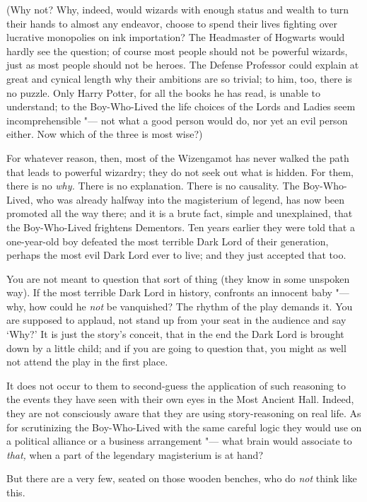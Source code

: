 (Why not? Why, indeed, would wizards with enough status and wealth to
turn their hands to almost any endeavor, choose to spend their lives
fighting over lucrative monopolies on ink importation? The Headmaster of
Hogwarts would hardly see the question; of course most people should not
be powerful wizards, just as most people should not be heroes. The
Defense Professor could explain at great and cynical length why their
ambitions are so trivial; to him, too, there is no puzzle. Only Harry
Potter, for all the books he has read, is unable to understand; to the
Boy-Who-Lived the life choices of the Lords and Ladies seem
incomprehensible "--- not what a good person would do, nor yet an evil
person either. Now which of the three is most wise?)

For whatever reason, then, most of the Wizengamot has never walked the
path that leads to powerful wizardry; they do not seek out what is
hidden. For them, there is no \emph{why.} There is no explanation. There
is no causality. The Boy-Who-Lived, who was already halfway into the
magisterium of legend, has now been promoted all the way there; and it
is a brute fact, simple and unexplained, that the Boy-Who-Lived
frightens Dementors. Ten years earlier they were told that a
one-year-old boy defeated the most terrible Dark Lord of their
generation, perhaps the most evil Dark Lord ever to live; and they just
accepted that too.

You are not meant to question that sort of thing (they know in some
unspoken way). If the most terrible Dark Lord in history, confronts an
innocent baby "--- why, how could he \emph{not} be vanquished? The rhythm
of the play demands it. You are supposed to applaud, not stand up from
your seat in the audience and say `Why?' It is just the story's conceit,
that in the end the Dark Lord is brought down by a little child; and if
you are going to question that, you might as well not attend the play in
the first place.

It does not occur to them to second-guess the application of such
reasoning to the events they have seen with their own eyes in the Most
Ancient Hall. Indeed, they are not consciously aware that they are using
story-reasoning on real life. As for scrutinizing the Boy-Who-Lived with
the same careful logic they would use on a political alliance or a
business arrangement "--- what brain would associate to \emph{that,} when a
part of the legendary magisterium is at hand?

But there are a very few, seated on those wooden benches, who do
\emph{not} think like this.

